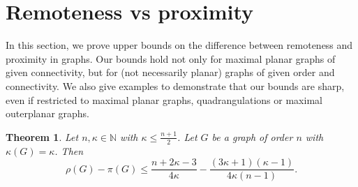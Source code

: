 \documentclass[a4paper,11pt]{article}
\newtheorem{theorem}{Theorem}[section]
\begin{document}
\section{Remoteness vs proximity}
\label{section:remoteness-vs-proximity}

In this section, we prove upper bounds on the difference between remoteness and proximity in graphs.
Our bounds hold not only for maximal planar graphs of given connectivity, but for (not necessarily planar)
graphs of given order and connectivity. 
We also give examples to demonstrate that our bounds are sharp, even if restricted to maximal planar graphs,
quadrangulations or maximal outerplanar graphs. 



\begin{theorem}\label{theo:remoteness-proximity}
Let $n, \kappa \in \mathbb{N}$ with $\kappa \leq \frac{n+1}{2}$. Let $G$ be a graph of order 
$n$ with $\kappa(G) = \kappa$. Then
\[
\rho(G) - \pi(G) \leq \frac{n+2\kappa-3}{4\kappa} 
              - \frac{(3\kappa+1)(\kappa-1)}{4\kappa (n-1)}.       \]                           
\end{theorem}
\end{document}
